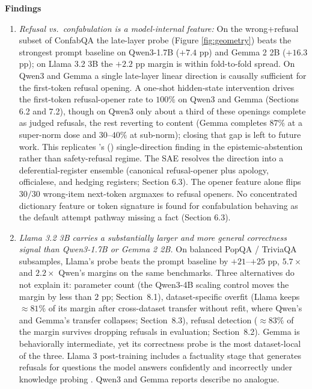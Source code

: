 \textbf{Findings}

\begin{enumerate}
\def\labelenumi{\arabic{enumi}.}
\item
  \emph{Refusal vs.~confabulation is a model-internal feature:} On the
  wrong+refusal subset of ConfabQA the late-layer probe (Figure \ref{fig:geometry}) beats the strongest prompt baseline on Qwen3-1.7B (\(+7.4\) pp) and Gemma 2 2B (\(+16.3\) pp); on Llama 3.2 3B the \(+2.2\) pp margin is within fold-to-fold spread. On Qwen3 and Gemma a single late-layer linear direction is causally sufficient for the first-token refusal opening. 
  A one-shot hidden-state intervention drives the first-token refusal-opener rate to \(100\%\)
  on Qwen3 and Gemma (Sections 6.2 and 7.2), though on Qwen3 only about a third of these openings complete as judged refusals, 
  the rest reverting to content (Gemma completes \(87\%\) at a super-norm dose and \(30\)--\(40\%\) at sub-norm); 
  closing that gap is left to future work. This replicates \citeauthor{arditi2024refusal}'s (\citeyear{arditi2024refusal}) 
  single-direction finding in the epistemic-abstention rather than safety-refusal regime.  
  The SAE resolves the
  direction into a deferential-register ensemble (canonical refusal-opener
  plus apology, officialese, and hedging registers; Section 6.3). The opener 
  feature alone flips \(30/30\) wrong-item next-token argmaxes
  to refusal openers. No
  concentrated dictionary feature or token signature is found for
  confabulation behaving as the default attempt pathway missing a
  fact (Section 6.3).
\item
  \emph{Llama 3.2 3B carries a substantially larger and more general
  correctness signal than Qwen3-1.7B or Gemma 2 2B.} On balanced PopQA /
  TriviaQA subsamples, Llama's probe beats the prompt baseline by
  \(+21\)--\(+25\) pp, \(5.7\times\) and \(2.2\times\) Qwen's margins on
  the same benchmarks. Three alternatives do not explain it: parameter
  count (the Qwen3-4B scaling control moves the margin by less than
  \(2\) pp; Section~8.1), dataset-specific overfit (Llama keeps
  \(\approx 81\%\) of its margin after cross-dataset transfer without
  refit, where Qwen's and Gemma's transfer collapses; Section~8.3),
  refusal detection (\(\approx 83\%\) of the margin survives dropping
  refusals in evaluation; Section~8.2). 
  Gemma is behaviorally intermediate, yet its
  correctness probe is the most dataset-local of the three. Llama 3 post-training includes a factuality stage that
  generates refusals for questions the model answers confidently and
  incorrectly under knowledge probing \citep[\S4.3.6]{grattafiori2024llama}.
  Qwen3 and Gemma reports describe no analogue.
\end{enumerate}

